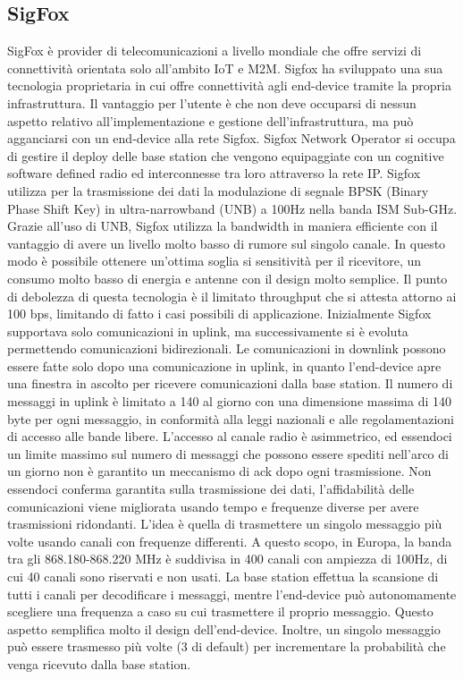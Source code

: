 \documentclass[12pt,a4paper,openright,twoside]{report}
\begin{document}
\subsection{SigFox}
SigFox \`e provider di telecomunicazioni a livello mondiale che offre servizi di connettivit\`a orientata solo all'ambito IoT e M2M. 
Sigfox ha sviluppato una sua tecnologia proprietaria in cui offre connettivit\`a agli end-device tramite la propria infrastruttura. 
Il vantaggio per l'utente \`e che non deve occuparsi di nessun aspetto relativo all'implementazione e gestione dell'infrastruttura, ma pu\`o agganciarsi con un end-device alla rete Sigfox. 
Sigfox Network Operator si occupa di gestire il deploy delle base station che vengono equipaggiate con un cognitive software defined radio ed interconnesse tra loro attraverso la rete IP.
Sigfox utilizza per la trasmissione dei dati la modulazione di segnale BPSK (Binary Phase Shift Key) in ultra-narrowband (UNB) a 100Hz nella banda ISM Sub-GHz.
Grazie all'uso di UNB, Sigfox utilizza la bandwidth in maniera efficiente con il vantaggio di avere un livello molto basso di rumore sul singolo canale. 
In questo modo \`e possibile ottenere un'ottima soglia si sensitivit\`a per il ricevitore, un consumo molto basso di energia e antenne con il design molto semplice. 
Il punto di debolezza di questa tecnologia \`e il limitato throughput che si attesta attorno ai 100 bps, limitando di fatto i casi possibili di applicazione. 
Inizialmente Sigfox supportava solo comunicazioni in uplink, ma successivamente si \`e evoluta permettendo comunicazioni bidirezionali. 
Le comunicazioni in downlink possono essere fatte solo dopo una comunicazione in uplink, in quanto l'end-device apre una finestra in ascolto per ricevere comunicazioni dalla base station. 
Il numero di messaggi in uplink \`e limitato a 140 al giorno con una dimensione massima di 140 byte per ogni messaggio, in conformit\`a alla leggi nazionali e alle regolamentazioni di accesso alle bande libere. L'accesso al canale radio \`e asimmetrico, ed essendoci un limite massimo sul numero di messaggi che possono essere spediti nell'arco di un giorno non \`e garantito un meccanismo di ack dopo ogni trasmissione.
Non essendoci conferma garantita sulla trasmissione dei dati,  l'affidabilit\`a delle comunicazioni viene migliorata usando tempo e frequenze diverse per avere trasmissioni ridondanti. 
L'idea \`e quella di trasmettere un singolo messaggio pi\`u volte usando canali con frequenze differenti. A questo scopo, in Europa, la banda tra gli 868.180-868.220 MHz \`e suddivisa in 400 canali con ampiezza di 100Hz, di cui 40 canali sono riservati e non usati. 
La base station effettua la scansione di tutti i canali per decodificare i messaggi, mentre l'end-device pu\`o autonomamente scegliere una frequenza a caso su cui trasmettere il proprio messaggio. 
Questo aspetto semplifica molto il design dell'end-device.  
Inoltre, un singolo messaggio pu\`o essere trasmesso pi\`u volte (3 di default) per incrementare la probabilit\`a che venga ricevuto dalla base station.
\end{document}
